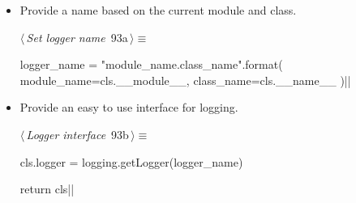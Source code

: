 \documentclass[%
    a4paper,    %
    justified,  %
    nobib,      %
    openany     %
]{tufte-book}
\begin{document}
\begin{itemize}
  \item Provide a name based on the current module and class.
    \begin{flushleft} \small
\begin{minipage}{\linewidth}\label{scrap57}\raggedright\small
{} $\langle\,${\itshape Set logger name}\nobreak\ {\footnotesize {93a}}$\,\rangle\equiv$
\vspace{-1ex}
\begin{pythoncode}
logger_name = "{module_name}.{class_name}".format(
    module_name=cls.__module__,
    class_name=cls.__name__
)|\NWsep|
\end{pythoncode}
\vspace{1.5ex}
\footnotesize
{}
\end{minipage}\vspace{4ex}
\end{flushleft}
\item Provide an easy to use interface for logging.
    \begin{flushleft} \small
\begin{minipage}{\linewidth}\label{scrap58}\raggedright\small
{} $\langle\,${\itshape Logger interface}\nobreak\ {\footnotesize {93b}}$\,\rangle\equiv$
\vspace{-1ex}
\begin{pythoncode}
cls.logger = logging.getLogger(logger_name)

return cls|\NWsep|
\end{pythoncode}
\vspace{1.5ex}
\footnotesize
{}
\end{minipage}\vspace{4ex}
\end{flushleft}
\end{itemize}
\end{document}
